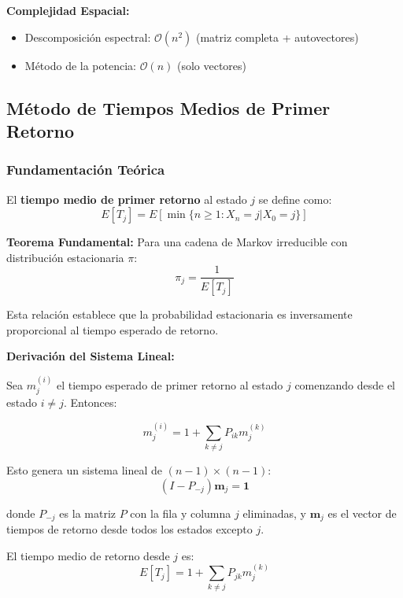 \textbf{Complejidad Espacial:}
\begin{itemize}
\item Descomposición espectral: $\mathcal{O}(n^2)$ (matriz completa + autovectores)
\item Método de la potencia: $\mathcal{O}(n)$ (solo vectores)
\end{itemize}

\subsection{Método de Tiempos Medios de Primer Retorno}

\subsubsection{Fundamentación Teórica}

El \textbf{tiempo medio de primer retorno} al estado $j$ se define como:
\begin{equation}
E[T_j] = E[\min\{n \geq 1 : X_n = j | X_0 = j\}]
\end{equation}

\textbf{Teorema Fundamental:} Para una cadena de Markov irreducible con distribución estacionaria $\pi$:
\begin{equation}
\pi_j = \frac{1}{E[T_j]}
\end{equation}

Esta relación establece que la probabilidad estacionaria es inversamente proporcional al tiempo esperado de retorno.

\textbf{Derivación del Sistema Lineal:}

Sea $m_j^{(i)}$ el tiempo esperado de primer retorno al estado $j$ comenzando desde el estado $i \neq j$. Entonces:

\begin{equation}
m_j^{(i)} = 1 + \sum_{k \neq j} P_{ik} m_j^{(k)}
\end{equation}

Esto genera un sistema lineal de $(n-1) \times (n-1)$:
\begin{equation}
(I - P_{-j}) \mathbf{m}_j = \mathbf{1}
\end{equation}

donde $P_{-j}$ es la matriz $P$ con la fila y columna $j$ eliminadas, y $\mathbf{m}_j$ es el vector de tiempos de retorno desde todos los estados excepto $j$.

El tiempo medio de retorno desde $j$ es:
\begin{equation}
E[T_j] = 1 + \sum_{k \neq j} P_{jk} m_j^{(k)}
\end{equation}

